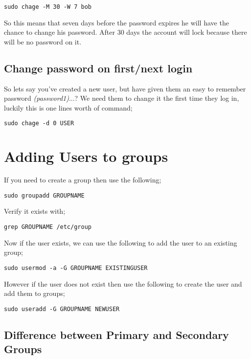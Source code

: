 \begin{lstlisting}
sudo chage -M 30 -W 7 bob
\end{lstlisting}

So this means that seven days before the password expires he will have the chance to change his password. After 30 days the account will lock because there will be no password on it.

\subsection{Change password on first/next login}

So lets say you've created a new user, but have given them an easy to remember password \textit{(password1)}...? We need them to change it the first time they log in, luckily this is one lines worth of command;

\begin{lstlisting}
sudo chage -d 0 USER
\end{lstlisting}

\section{Adding Users to groups}

If you need to create a group then use the following;

\begin{lstlisting}
sudo groupadd GROUPNAME
\end{lstlisting}

Verify it exists with;

\begin{lstlisting}
grep GROUPNAME /etc/group
\end{lstlisting}

Now if the user exists, we can use the following to add the user to an existing group;

\begin{lstlisting}
sudo usermod -a -G GROUPNAME EXISTINGUSER
\end{lstlisting}

However if the user does not exist then use the following to create the user and add them to groups;

\begin{lstlisting}
sudo useradd -G GROUPNAME NEWUSER
\end{lstlisting}

\subsection{Difference between Primary and Secondary Groups}

